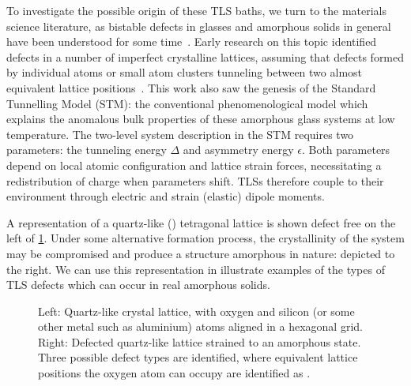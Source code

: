To investigate the possible origin of these TLS baths, we turn to the materials science literature, as bistable defects in glasses and amorphous solids in general have been understood for some time~\cite{Zachariasen1932,Anderson1972}.
Early research on this topic identified defects in a number of imperfect crystalline lattices, assuming that defects formed by individual atoms or small atom clusters tunneling between two almost equivalent lattice positions~\cite{Anderson1972,Phillips1972}.
This work also saw the genesis of the Standard Tunnelling Model (STM): the conventional phenomenological  model which explains the anomalous bulk properties of these amorphous glass systems at low temperature.
The two-level system description in the STM requires two parameters: the tunneling energy $\Delta$ and asymmetry energy $\epsilon$.
Both parameters depend on local atomic configuration and lattice strain forces, necessitating a redistribution of charge when parameters shift.
TLSs therefore couple to their environment through electric and strain (elastic) dipole moments.

A representation of a quartz-like () tetragonal lattice is shown defect free on the left of \cref{fig:sio2}.
Under some alternative formation process, the crystallinity of the system may be compromised and produce a structure amorphous in nature: depicted to the right.
We can use this representation in illustrate examples of the types of TLS defects which can occur in real amorphous solids.
\begin{figure}[htp]
\siotwomargins
\begin{adjustwidth}{\siotwoleft}{\siotworight}
\resizebox{\widefigure}{!}{}
\caption[Quartz-like Crystal Lattice, Pure and Defected]{\label{fig:sio2}Left: Quartz-like crystal lattice, with oxygen \resizebox{!}{0.6em}{} and silicon (or some other metal such as aluminium) \resizebox{!}{0.6em}{} atoms aligned in a hexagonal grid. Right: Defected quartz-like lattice strained to an amorphous state. Three possible defect types are identified, where equivalent lattice positions the oxygen atom can occupy are identified as \resizebox{!}{0.6em}{}.}
\end{adjustwidth}
\end{figure}

